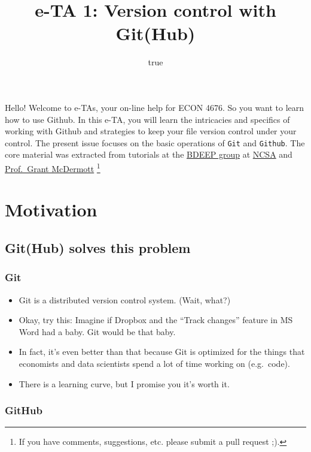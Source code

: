 \documentclass[
]{article}
\title{e-TA 1: Version control with Git(Hub)}
\author{true}
\date{}
\providecommand{\tightlist}{%
  \setlength{\itemsep}{0pt}\setlength{\parskip}{0pt}}
\begin{document}
\maketitle

Hello! Welcome to e-TAs, your on-line help for ECON 4676. So you want to
learn how to use Github. In this e-TA, you will learn the intricacies
and specifics of working with Github and strategies to keep your file
version control under your control. The present issue focuses on the
basic operations of \texttt{Git} and \texttt{Github}. The core material
was extracted from tutorials at the
\href{https://www.uiuc-bdeep.org/about}{BDEEP group} at
\href{http://www.ncsa.illinois.edu/site}{NCSA} and
\href{https://grantmcdermott.com/}{Prof.~Grant McDermott} \footnote{If
  you have comments, suggestions, etc. please submit a pull request ;).}

\hypertarget{motivation}{%
\section{Motivation}\label{motivation}}

\hypertarget{github-solves-this-problem}{%
\subsection{Git(Hub) solves this
problem}\label{github-solves-this-problem}}

\hypertarget{git}{%
\subsubsection{Git}\label{git}}

\begin{itemize}
\tightlist
\item
  Git is a distributed version control system. (Wait, what?)
\item
  Okay, try this: Imagine if Dropbox and the ``Track changes'' feature
  in MS Word had a baby. Git would be that baby.
\item
  In fact, it's even better than that because Git is optimized for the
  things that economists and data scientists spend a lot of time working
  on (e.g.~code).
\item
  There is a learning curve, but I promise you it's worth it.
\end{itemize}

\hypertarget{github}{%
\subsubsection{GitHub}\label{github}}
\end{document}
